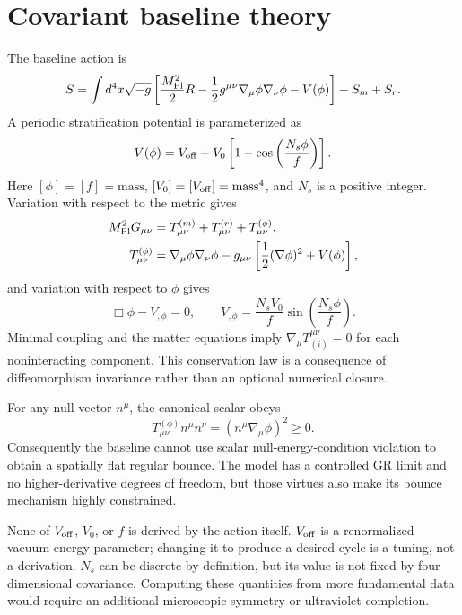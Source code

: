 \section{Covariant baseline theory}
The baseline action is
\begin{equation}
S=\int d^4x\sqrt{-g}\left[\frac{M_{\mathrm{Pl}}^2}{2}R-\frac12 g^{\mu\nu}\nabla_\mu\phi\nabla_\nu\phi-V(\phi)\right]+S_m+S_r.
\end{equation}
A periodic stratification potential is parameterized as
\begin{equation}
V(\phi)=V_{\rm off}+V_0\left[1-\cos\left(\frac{N_s\phi}{f}\right)\right].
\end{equation}
Here $[\phi]=[f]=\mathrm{mass}$, $[V_0]=[V_{\rm off}]=\mathrm{mass}^4$, and $N_s$ is a positive integer. Variation with respect to the metric gives
\begin{align}
M_{\mathrm{Pl}}^2G_{\mu\nu}&=T^{(m)}_{\mu\nu}+T^{(r)}_{\mu\nu}+T^{(\phi)}_{\mu\nu},\\
T^{(\phi)}_{\mu\nu}&=\nabla_\mu\phi\nabla_\nu\phi-g_{\mu\nu}\left[\frac12(\nabla\phi)^2+V(\phi)\right],
\end{align}
and variation with respect to $\phi$ gives
\begin{equation}
\Box\phi-V_{,\phi}=0,\qquad
V_{,\phi}=\frac{N_sV_0}{f}\sin\left(\frac{N_s\phi}{f}\right).
\end{equation}
Minimal coupling and the matter equations imply $\nabla_\mu T^{\mu\nu}_{(i)}=0$ for each noninteracting component. This conservation law is a consequence of diffeomorphism invariance rather than an optional numerical closure.

For any null vector $n^\mu$, the canonical scalar obeys
\begin{equation}
T^{(\phi)}_{\mu\nu}n^\mu n^\nu=(n^\mu\nabla_\mu\phi)^2\ge0.
\end{equation}
Consequently the baseline cannot use scalar null-energy-condition violation to obtain a spatially flat regular bounce. The model has a controlled GR limit and no higher-derivative degrees of freedom, but those virtues also make its bounce mechanism highly constrained.

None of $V_{\rm off}$, $V_0$, or $f$ is derived by the action itself. $V_{\rm off}$ is a renormalized vacuum-energy parameter; changing it to produce a desired cycle is a tuning, not a derivation. $N_s$ can be discrete by definition, but its value is not fixed by four-dimensional covariance. Computing these quantities from more fundamental data would require an additional microscopic symmetry or ultraviolet completion.
